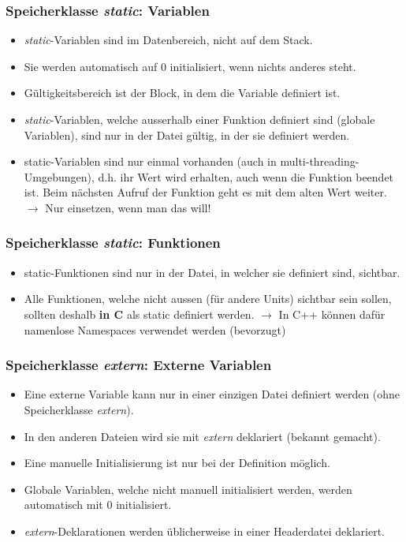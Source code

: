 \subsubsection{Speicherklasse \emph{static}: Variablen}
\begin{itemize}
	\item \emph{static}-Variablen sind im Datenbereich, nicht auf dem Stack.
	\item Sie werden automatisch auf 0 initialisiert, wenn nichts anderes steht.
	\item Gültigkeitsbereich ist der Block, in dem die Variable definiert ist.
	\item \emph{static}-Variablen, welche ausserhalb einer Funktion definiert sind (globale Variablen), sind nur in der Datei gültig, in der sie definiert werden.
	\item static-Variablen sind nur einmal vorhanden (auch in multi-threading-Umgebungen), d.h. ihr Wert wird erhalten, auch wenn die Funktion beendet ist. Beim nächsten Aufruf der Funktion geht es mit dem alten Wert weiter. $\rightarrow$ \color{red}Nur einsetzen, wenn man das will!\color{black}
\end{itemize}

\subsubsection{Speicherklasse \emph{static}: Funktionen}
\begin{itemize}
	\item static-Funktionen sind nur in der Datei, in welcher sie definiert sind, sichtbar.
	\item Alle Funktionen, welche nicht aussen (für andere Units) sichtbar sein sollen, sollten deshalb \textbf{in C} als static definiert werden. $\rightarrow$ \color{red}In C++ können dafür namenlose Namespaces verwendet werden (bevorzugt)\color{black}
\end{itemize}

\subsubsection{Speicherklasse \emph{extern}: Externe Variablen}
\begin{itemize}
	\item Eine externe Variable kann nur in einer einzigen Datei definiert werden (ohne Speicherklasse \emph{extern}).
	\item In den anderen Dateien wird sie mit \emph{extern} deklariert (bekannt gemacht).
	\item Eine manuelle Initialisierung ist nur bei der Definition möglich.
	\item Globale Variablen, welche nicht manuell initialisiert werden, werden automatisch mit 0 initialisiert.
	\item \emph{extern}-Deklarationen werden üblicherweise in einer Headerdatei deklariert.
\end{itemize}

